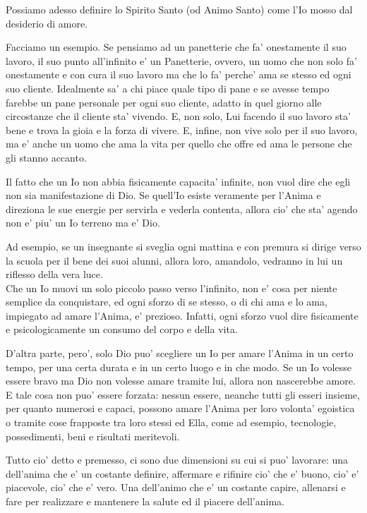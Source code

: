 Possiamo adesso definire lo Spirito Santo (od Animo Santo) come l'Io mosso dal desiderio di amore. 

Facciamo un esempio. Se pensiamo ad un panetterie che fa' onestamente il suo lavoro, il suo punto all'infinito e' un Panetterie, ovvero, un uomo che non solo fa' onestamente e con cura il suo lavoro ma che lo fa' perche' ama se stesso ed ogni suo cliente. Idealmente sa' a chi piace quale tipo di pane e se avesse tempo farebbe un pane personale per ogni suo cliente, adatto in quel giorno alle circostanze che il cliente sta' vivendo. E, non solo, Lui facendo il suo lavoro sta' bene e trova la gioia e la forza di vivere. E, infine, non vive solo per il suo lavoro, ma e' anche un uomo che ama la vita per quello che offre ed ama le persone che gli stanno accanto.

Il fatto che un Io non abbia fisicamente capacita' infinite, non vuol dire che egli non sia manifestazione di Dio. Se quell'Io esiste veramente per l'Anima e direziona le sue energie per servirla e vederla contenta, allora cio' che sta' agendo non e' piu' un Io terreno ma e' Dio.

Ad esempio, se un insegnante si sveglia ogni mattina e con premura si dirige verso la scuola per il bene dei suoi alunni, allora loro, amandolo, vedranno in lui un riflesso della vera luce.\\

Che un Io muovi un solo piccolo passo verso l'infinito, non e' cosa per niente semplice da conquistare, ed ogni sforzo di se stesso, o di chi ama e lo ama, impiegato ad amare l'Anima, e' prezioso. Infatti, ogni sforzo vuol dire fisicamente e psicologicamente un consumo del corpo e della vita.

D'altra parte, pero', solo Dio puo' scegliere un Io per amare l'Anima in un certo tempo, per una certa durata e in un certo luogo e in che modo. Se un Io volesse essere bravo ma Dio non volesse amare tramite lui, allora non nascerebbe amore. E tale cosa non puo' essere forzata: nessun essere, neanche tutti gli esseri insieme, per quanto numerosi e capaci, possono amare l'Anima per loro volonta' egoistica o tramite cose frapposte tra loro stessi ed Ella, come ad esempio, tecnologie, possedimenti, beni e risultati meritevoli. 

Tutto cio' detto e premesso, ci sono due dimensioni su cui si puo' lavorare: una dell'anima che e' un costante definire, affermare e rifinire cio' che e' buono, cio' e' piacevole, cio' che e' vero. Una dell'animo che e' un costante capire, allenarsi e fare per realizzare e mantenere la salute ed il piacere dell'anima.

